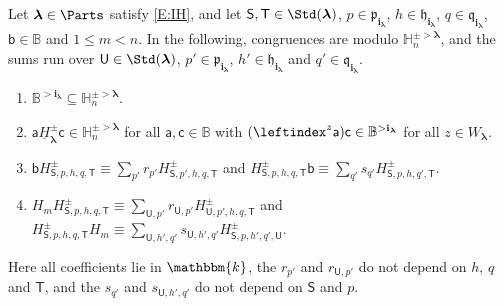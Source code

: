 \documentclass[a4paper,11pt]{amsart}
\newcommand\blam{{\boldsymbol\lambda}}
\newcommand\bi{\mathbf{i}}
\newcommand\ilam[1][\blam]{\bi_{#1}}
\numberwithin{equation}{subsection}
\theoremstyle{definition}
\theoremstyle{theorem}
\theoremstyle{remark}
\newcommand\plam[1][\lambda]{\mathfrak{p}_{#1}}
\newcommand\hlam[1][\lambda]{\mathfrak{h}_{#1}}
\newcommand\qlam[1][\lambda]{\mathfrak{q}_{#1}}
\newcommand\HH{\mathbb{H}}
\newcommand\HJpm{\underline{H}^\pm}
\newcommand\Sym{W}
\newcommand\ba{\mathsf{a}}
\newcommand\bb{\mathsf{b}}
\newcommand\bc{\mathsf{c}}
\newcommand\bS{{\mathsf{S}}}
\newcommand\bT{{\mathsf{T}}}
\newcommand\bU{{\mathsf{U}}}
\newcommand\kk{\mathbbm{k}}
\newcommand{\Bo}{\mathbb{B}}
\begin{document}
\begin{Lemma}\label{L:InductiveStep}
  Let $\blam\in\Parts$ satisfy \autoref{E:IH}, and let $\bS,\bT\in\Std(\blam)$, $p\in\plam[\ilam]$,
  $h\in\hlam[\ilam]$, $q\in\qlam[\ilam]$, $\bb\in\Bo$ and $1\le m<n$. In the following, congruences
  are modulo $\HH^{\pm>\blam}_n$, and the sums run over $\bU\in\Std(\blam)$, $p'\in\plam[\ilam]$,
  $h'\in\hlam[\ilam]$ and $q'\in\qlam[\ilam]$.
  \begin{enumerate}
  \item\label{E:BoInIdeal} $\Bo^{>\ilam}\subseteq\HH^{\pm>\blam}_n$.
  \item\label{E:sandwich} $\ba\HJpm_\blam\bc\in\HH^{\pm>\blam}_n$ for all $\ba,\bc\in\Bo$ with
    $(\leftindex^z{\ba})\bc\in\Bo^{>\ilam}$ for all $z\in\Sym_\blam$.
  \item\label{E:BoAction}
    $\bb H^\pm_{\bS,p,h,q,\bT}\equiv\sum_{p'}r_{p'}H^\pm_{\bS,p',h,q,\bT}$ and
    $H^\pm_{\bS,p,h,q,\bT}\bb\equiv\sum_{q'}s_{q'}H^\pm_{\bS,p,h,q',\bT}$.
  \item\label{E:HmAction}
    $H_mH^\pm_{\bS,p,h,q,\bT}\equiv\sum_{\bU,p'}r_{\bU,p'}H^\pm_{\bU,p',h,q,\bT}$ and
    $H^\pm_{\bS,p,h,q,\bT}H_m\equiv\sum_{\bU,h',q'}s_{\bU,h',q'}H^\pm_{\bS,p,h',q',\bU}$.
  \end{enumerate}
  Here all coefficients lie in $\kk$, the $r_{p'}$ and $r_{\bU,p'}$ do not depend on $h$, $q$ and
  $\bT$, and the $s_{q'}$ and $s_{\bU,h',q'}$ do not depend on $\bS$ and $p$.
\end{Lemma}
\end{document}
